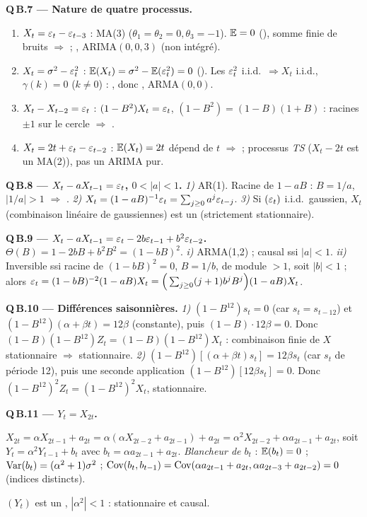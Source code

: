 \documentclass[11pt]{article}
\begin{document}
\textbf{Q\,B.7 --- Nature de quatre processus.}
\begin{enumerate}[label=\arabic*),leftmargin=*,nosep]
\item $X_t=\varepsilon_t-\varepsilon_{t-3}$ : MA(3) ($\theta_1=\theta_2=0,\theta_3=-1$). $\mathbb{E}=0$
(), somme finie de bruits $\Rightarrow$  ;
, ARIMA$(0,0,3)$ (non intégré).
\item $X_t=\sigma^2-\varepsilon_t^2$ : $\mathbb{E}(X_t)=\sigma^2-\mathbb{E}(\varepsilon_t^2)=0$ (). Les
$\varepsilon_t^2$ i.i.d.\ $\Rightarrow X_t$ i.i.d., $\gamma(k)=0$ ($k\ne0$) : ,
donc , ARMA$(0,0)$.
\item $X_t-X_{t-2}=\varepsilon_t$ : $(1-B^2)X_t=\varepsilon_t$, $(1-B^2)=(1-B)(1+B)$ : racines $\pm1$ sur le
cercle $\Rightarrow$ .
\item $X_t=2t+\varepsilon_t-\varepsilon_{t-2}$ : $\mathbb{E}(X_t)=2t$ dépend de $t$ $\Rightarrow$  ; processus \emph{TS} ($X_t-2t$ est un MA(2)), pas un ARIMA pur.
\end{enumerate}

\textbf{Q\,B.8 --- $X_t-aX_{t-1}=\varepsilon_t$, $0<|a|<1$.}
\emph{1)} AR(1). Racine de $1-aB$ : $B=1/a$, $|1/a|>1$ $\Rightarrow$ .
\emph{2)} $X_t=(1-aB)^{-1}\varepsilon_t=\sum_{j\ge0}a^j\varepsilon_{t-j}$.
\emph{3)} Si $(\varepsilon_t)$ i.i.d.\ gaussien, $X_t$ (combinaison linéaire de gaussiennes) est un
 (strictement stationnaire).

\textbf{Q\,B.9 --- $X_t-aX_{t-1}=\varepsilon_t-2b\varepsilon_{t-1}+b^2\varepsilon_{t-2}$.}
$\Theta(B)=1-2bB+b^2B^2=(1-bB)^2$.
\emph{i)} ARMA(1,2) ; causal ssi $|a|<1$.
\emph{ii)} Inversible ssi racine de $(1-bB)^2=0$, $B=1/b$, de module $>1$, soit $|b|<1$ ; alors
$\varepsilon_t=(1-bB)^{-2}(1-aB)X_t=\Big(\sum_{j\ge0}(j+1)b^jB^j\Big)(1-aB)X_t$.

\textbf{Q\,B.10 --- Différences saisonnières.}
\emph{1)} $(1-B^{12})s_t=0$ (car $s_t=s_{t-12}$) et $(1-B^{12})(\alpha+\beta t)=12\beta$
(constante), puis $(1-B)\cdot12\beta=0$. Donc
$(1-B)(1-B^{12})Z_t=(1-B)(1-B^{12})X_t$ : combinaison finie de $X$ stationnaire $\Rightarrow$
stationnaire.
\emph{2)} $(1-B^{12})[(\alpha+\beta t)s_t]=12\beta s_t$ (car $s_t$ de période 12), puis une
seconde application $(1-B^{12})[12\beta s_t]=0$. Donc $(1-B^{12})^2Z_t=(1-B^{12})^2X_t$,
stationnaire.

\textbf{Q\,B.11 --- $Y_t=X_{2t}$.}
\begin{etapes}
$X_{2t}=\alpha X_{2t-1}+a_{2t}=\alpha(\alpha X_{2t-2}+a_{2t-1})+a_{2t}
=\alpha^2X_{2t-2}+\alpha a_{2t-1}+a_{2t}$, soit $Y_t=\alpha^2Y_{t-1}+b_t$ avec
$b_t=\alpha a_{2t-1}+a_{2t}$.
\emph{Blancheur de $b_t$} : $\mathbb{E}(b_t)=0$ ; $\operatorname{Var}(b_t)=(\alpha^2+1)\sigma^2$ ;
$\operatorname{Cov}(b_t,b_{t-1})=\operatorname{Cov}(\alpha a_{2t-1}+a_{2t},\alpha a_{2t-3}+a_{2t-2})=0$ (indices distincts).
\end{etapes}
\begin{reponse}$(Y_t)$ est un , $|\alpha^2|<1$ :
stationnaire et causal.\end{reponse}
\end{document}
